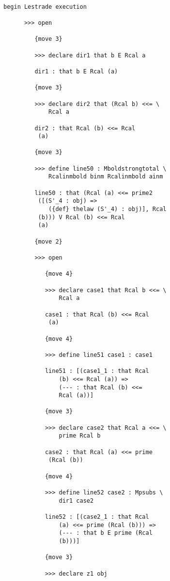 \documentclass[12pt]{article}
\begin{document}
\begin{verbatim}

begin Lestrade execution

      >>> open

         {move 3}

         >>> declare dir1 that b E Rcal a

         dir1 : that b E Rcal (a)

         {move 3}

         >>> declare dir2 that (Rcal b) <<= \
             Rcal a

         dir2 : that Rcal (b) <<= Rcal 
          (a)

         {move 3}

         >>> define line50 : Mboldstrongtotal \
             Rcalinmbold binm Rcalinmbold ainm

         line50 : that (Rcal (a) <<= prime2 
          ([(S'_4 : obj) => 
             ({def} thelaw (S'_4) : obj)], Rcal 
          (b))) V Rcal (b) <<= Rcal 
          (a)

         {move 2}

         >>> open

            {move 4}

            >>> declare case1 that Rcal b <<= \
                Rcal a

            case1 : that Rcal (b) <<= Rcal 
             (a)

            {move 4}

            >>> define line51 case1 : case1

            line51 : [(case1_1 : that Rcal 
                (b) <<= Rcal (a)) => 
                (--- : that Rcal (b) <<= 
                Rcal (a))]

            {move 3}

            >>> declare case2 that Rcal a <<= \
                prime Rcal b

            case2 : that Rcal (a) <<= prime 
             (Rcal (b))

            {move 4}

            >>> define line52 case2 : Mpsubs \
                dir1 case2

            line52 : [(case2_1 : that Rcal 
                (a) <<= prime (Rcal (b))) => 
                (--- : that b E prime (Rcal 
                (b)))]

            {move 3}

            >>> declare z1 obj


\end{verbatim}
\end{document}
